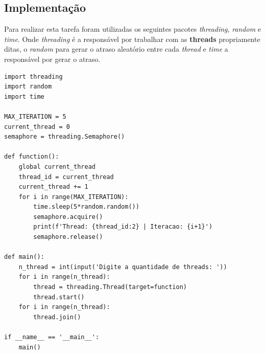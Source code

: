 \documentclass[a4paper, 11pt]{article}
\begin{document}
\subsection{Implementação}
Para realizar esta tarefa foram utilizadas os seguintes pacotes \textit{threading}, \textit{random} e \textit{time}. Onde \textit{threading} é a responsável por trabalhar com as \textbf{threads} propriamente ditas, o \textit{random} para gerar o atraso aleatório entre cada \textit{thread} e \textit{time} a responsável por gerar o atraso.

\lstset{language=Python}
\begin{lstlisting}
import threading
import random
import time

MAX_ITERATION = 5
current_thread = 0
semaphore = threading.Semaphore()

def function():
    global current_thread
    thread_id = current_thread
    current_thread += 1
    for i in range(MAX_ITERATION):
        time.sleep(5*random.random())
        semaphore.acquire()
        print(f'Thread: {thread_id:2} | Iteracao: {i+1}')
        semaphore.release()

def main():
    n_thread = int(input('Digite a quantidade de threads: '))
    for i in range(n_thread):
        thread = threading.Thread(target=function)
        thread.start()
    for i in range(n_thread):
        thread.join()

if __name__ == '__main__':
	main()
\end{lstlisting}
\end{document}
